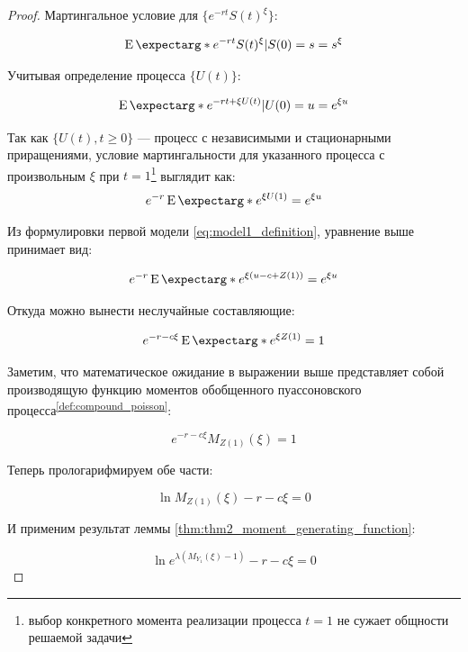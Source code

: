\documentclass[a4paper,12pt]{article}
\theoremstyle{definition}
\newcommand{\expect}{\operatorname{E}\expectarg}
\begin{document}
\begin{proof}
Мартингальное условие для $\{e^{-rt} S(t)^{\xi}\}$:

\begin{equation*}
\expect*{e^{-rt} S(t)^{\xi}|S(0) = s} = s^{\xi}
\end{equation*}

Учитывая определение процесса $\{U(t)\}$:

\begin{equation*}
\expect*{e^{-rt + \xi U(t)}|U(0) = u} = e^{\xi u}
\end{equation*}

Так как $\{U(t), t \ge 0\}$ --- процесс с независимыми и стационарными приращениями, условие мартингальности для указанного процесса с произвольным $\xi$ при $t = 1$\footnote{выбор конкретного момента реализации процесса $t=1$ не сужает общности решаемой задачи} выглядит как:
\begin{equation*}\label{eq:thm2_eq1}
e^{-r}\expect*{e^{\xi U(1)}} = e^{\xi u}
\end{equation*}

Из формулировки первой модели \eqref{eq:model1_definition}, уравнение выше принимает вид:

\begin{equation*}
e^{-r}\expect*{e^{\xi(u - c + Z(1))}} = e^{\xi u}
\end{equation*}

Откуда можно вынести неслучайные составляющие:

\begin{equation*}
e^{-r - c \xi} \expect*{e^{\xi Z(1)}} = 1
\end{equation*}

Заметим, что математическое ожидание в выражении выше представляет собой производящую функцию моментов обобщенного пуассоновского процесса\textsuperscript{{\ref{def:compound_poisson}}}:

\begin{equation*}
e^{-r - c \xi} M_{Z(1)}(\xi) = 1
\end{equation*}

Теперь прологарифмируем обе части:

\begin{equation*}
\ln{M_{Z(1)}(\xi)} - r - c\xi = 0
\end{equation*}

И применим результат леммы \ref{thm:thm2_moment_generating_function}:

\begin{equation*}
\ln{e^{\lambda (M_{Y_1}(\xi) - 1)}} - r - c\xi = 0
\end{equation*}


\end{proof}
\end{document}
